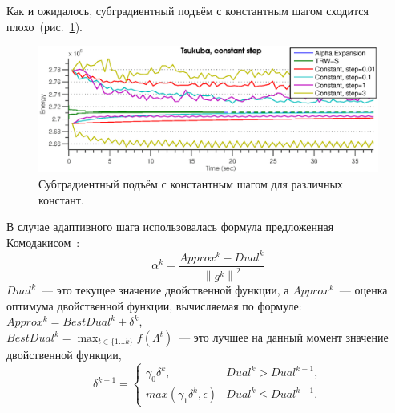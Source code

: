 \documentclass{article}
\begin{document}
Как и ожидалось, субградиентный подъём с константным шагом сходится плохо~(рис.~\ref{fig:constant_subgradient}).\\
\begin{figure}
    \centering
    \includegraphics[width=\textwidth]{constant_subgradient_tsukuba.eps}
    \caption{Субградиентный подъём с константным шагом для различных констант.}
    \label{fig:constant_subgradient}
\end{figure}
В случае адаптивного шага использовалась формула предложенная Комодакисом~\cite{SubgradientWeights}:\\
\begin{equation}
\alpha^k = \frac{Approx^k - Dual^k}{\left \| g^k \right \|^2}
\end{equation}
$Dual^k$~--- это текущее значение двойственной функции, а $Approx^k$~--- оценка оптимума двойственной функции, вычисляемая по формуле:\\
$Approx^k = BestDual^k + \delta^k$,\\
$BestDual^k = \max_{t \in \{1 \dots k\}} f(\Lambda^t)$~--- это лучшее на данный момент значение двойственной функции,\\
\begin{equation}
    \delta^{k+1} = \begin{cases}
    \gamma_0 \delta^k, & Dual^k > Dual^{k-1},\\
    max(\gamma_1 \delta^k, \epsilon) & Dual^k \leqslant  Dual^{k-1}.
    \end{cases}
\end{equation}
\end{document}
